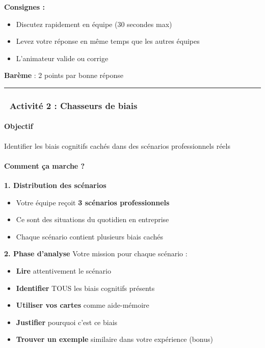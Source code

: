 \documentclass[
]{article}
\providecommand{\tightlist}{%
  \setlength{\itemsep}{0pt}\setlength{\parskip}{0pt}}
\begin{document}
\textbf{Consignes :}

\begin{itemize}
\tightlist
\item
  Discutez rapidement en équipe (30 secondes max)
\item
  Levez votre réponse en même temps que les autres équipes
\item
  L'animateur valide ou corrige
\end{itemize}

\textbf{Barème} : 2 points par bonne réponse

\begin{center}\rule{0.5\linewidth}{0.5pt}\end{center}

\subsubsection{🎯 Activité 2 : Chasseurs de
biais}\label{activituxe9-2-chasseurs-de-biais}

\paragraph{\texorpdfstring{\textbf{Objectif}}{Objectif}}\label{objectif}

Identifier les biais cognitifs cachés dans des scénarios professionnels
réels

\paragraph{\texorpdfstring{\textbf{Comment ça marche
?}}{Comment ça marche ?}}\label{comment-uxe7a-marche}

\textbf{1. Distribution des scénarios}

\begin{itemize}
\tightlist
\item
  Votre équipe reçoit \textbf{3 scénarios professionnels}
\item
  Ce sont des situations du quotidien en entreprise
\item
  Chaque scénario contient plusieurs biais cachés
\end{itemize}

\textbf{2. Phase d'analyse} Votre mission pour chaque scénario :

\begin{itemize}
\tightlist
\item
  \textbf{Lire} attentivement le scénario
\item
  \textbf{Identifier} TOUS les biais cognitifs présents
\item
  \textbf{Utiliser vos cartes} comme aide-mémoire
\item
  \textbf{Justifier} pourquoi c'est ce biais
\item
  \textbf{Trouver un exemple} similaire dans votre expérience (bonus)
\end{itemize}
\end{document}
